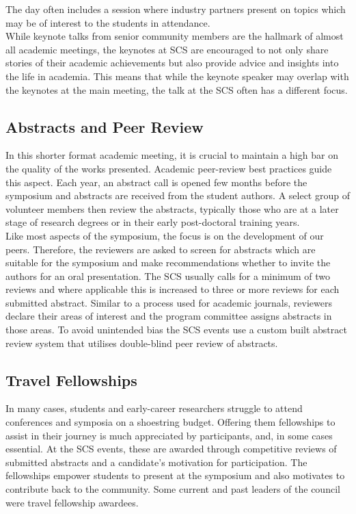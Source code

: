 \documentclass[]{article}%
\begin{document}
	The day often includes a session where industry partners present on topics which may be of interest to the students in attendance.\\
	
	While keynote talks from senior community members are the hallmark of almost all academic meetings, the keynotes at SCS are encouraged to not only share stories of their academic achievements but also provide advice and insights into the life in academia.  This means that while the keynote speaker may overlap with the keynotes at the main meeting, the talk at the SCS often has a different focus.\\
	
	
	\subsection*{Abstracts and Peer Review}
	
	In this shorter format academic meeting, it is crucial to maintain a high bar on the quality of the works presented. Academic peer-review best practices guide this aspect. Each year, an abstract call is opened few months before the symposium and abstracts are received from the student authors. A select group of volunteer members then review the abstracts, typically those who are at a later stage of research degrees or in their early post-doctoral training years. \\
	
	Like most aspects of the symposium, the focus is on the development of our peers. Therefore, the reviewers are asked to screen for abstracts which are suitable for the symposium and make recommendations whether to invite the authors for an oral presentation. The SCS usually calls for a minimum of two reviews and where applicable this is increased to three or more reviews for each submitted abstract. Similar to a process used for academic journals, reviewers declare their areas of interest and the program committee assigns abstracts in those areas. To avoid unintended bias \citep{darling2014, BUDDEN20084} the SCS events use a custom built abstract review system that utilises double-blind peer review \citep{Largent201675} of abstracts. 
	
	
	\subsection*{Travel Fellowships}
	
	In many cases, students and early-career researchers struggle to attend conferences and symposia on a shoestring budget. Offering them fellowships to assist in their journey is much appreciated by participants, and, in some cases essential. At the SCS events, these are awarded through competitive reviews of submitted abstracts and a candidate’s motivation for participation. The fellowships empower students to present at the symposium and also motivates to contribute back to the community. Some current and past leaders of the council were travel fellowship awardees.\\
	
\end{document}
